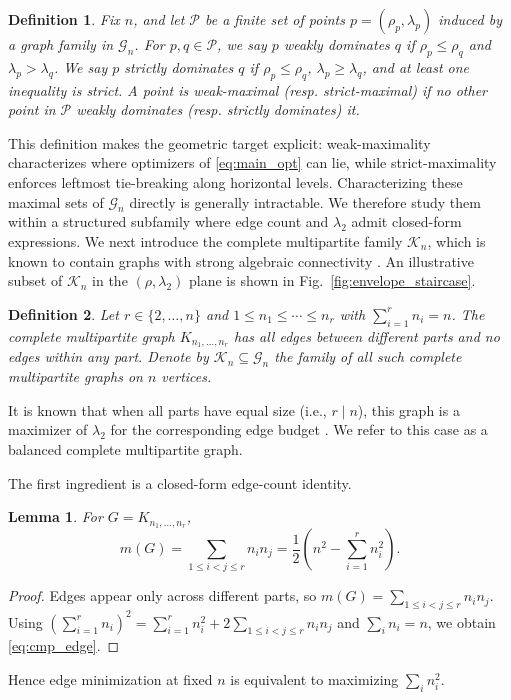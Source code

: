 \documentclass[letterpaper, 10 pt, conference]{ieeeconf}  %
\newtheorem{lemma}{Lemma}
\newtheorem{definition}{Definition}
\newcommand{\1}{\mathbf{1}}
\newcommand{\0}{\mathbf{0}}
\begin{document}
\begin{definition}
Fix \(n\), and let \(\mathcal P\) be a finite set of points \(p=(\rho_p,\lambda_p)\) induced by a graph family in \(\mathcal G_n\).
For \(p,q\in\mathcal P\), we say \(p\) \emph{weakly dominates} \(q\) if \(\rho_p\le \rho_q\) and \(\lambda_p>\lambda_q\).
We say \(p\) \emph{strictly dominates} \(q\) if \(\rho_p\le \rho_q\), \(\lambda_p\ge \lambda_q\), and at least one inequality is strict.
A point is \emph{weak-maximal} (resp. \emph{strict-maximal}) if no other point in \(\mathcal P\) weakly dominates (resp. strictly dominates) it.
\end{definition}
This definition makes the geometric target explicit: weak-maximality characterizes where optimizers of \eqref{eq:main_opt} can lie, while strict-maximality enforces leftmost tie-breaking along horizontal levels.
Characterizing these maximal sets of \(\mathcal G_n\) directly is generally intractable.
We therefore study them within a structured subfamily where edge count and \(\lambda_2\) admit closed-form expressions.
We next introduce the complete multipartite family \(\mathcal K_n\), which is known to contain graphs with strong algebraic connectivity \cite{ogiwara,Shahbaz23}.
An illustrative subset of \(\mathcal K_n\) in the \((\rho,\lambda_2)\) plane is shown in Fig.~\ref{fig:envelope_staircase}.
\begin{definition}
Let \(r\in\{2,\dots,n\}\) and \(1\le n_1\le \cdots \le n_r\) with \(\sum_{i=1}^r n_i=n\).
The complete multipartite graph \(K_{n_1,\dots,n_r}\) has all edges between different parts and no edges within any part.
Denote by \(\mathcal K_n\subseteq\mathcal G_n\) the family of all such complete multipartite graphs on \(n\) vertices.
\end{definition}
It is known that when all parts have equal size (i.e., \(r\mid n\)), this graph is a maximizer of \(\lambda_2\) for the corresponding edge budget \cite{ishii2016extensions}.
We refer to this case as a balanced complete multipartite graph.

The first ingredient is a closed-form edge-count identity.
\begin{lemma}\label{lem:cmp_edge_count}
For \(G=K_{n_1,\dots,n_r}\),
\begin{equation}
m(G)=\sum_{1\le i<j\le r}n_i n_j
=\frac{1}{2}\left(n^2-\sum_{i=1}^r n_i^2\right).
\label{eq:cmp_edge}
\end{equation}
\end{lemma}
\begin{proof}
Edges appear only across different parts, so \(m(G)=\sum_{1\le i<j\le r} n_i n_j\).
Using \(\left(\sum_{i=1}^r n_i\right)^2=\sum_{i=1}^r n_i^2+2\sum_{1\le i<j\le r} n_i n_j\) and \(\sum_i n_i=n\), we obtain \eqref{eq:cmp_edge}.
\end{proof}
Hence edge minimization at fixed \(n\) is equivalent to maximizing \(\sum_i n_i^2\).
\end{document}
